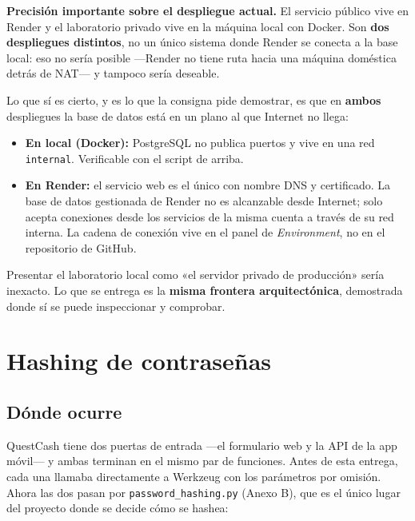 \documentclass[11pt,letterpaper]{article}
\begin{document}
\begin{alerta}
\textbf{Precisión importante sobre el despliegue actual.} El servicio público
vive en Render y el laboratorio privado vive en la máquina local con Docker.
Son \textbf{dos despliegues distintos}, no un único sistema donde Render se
conecta a la base local: eso no sería posible —Render no tiene ruta hacia una
máquina doméstica detrás de NAT— y tampoco sería deseable.

Lo que sí es cierto, y es lo que la consigna pide demostrar, es que en
\textbf{ambos} despliegues la base de datos está en un plano al que Internet no
llega:

\begin{itemize}[leftmargin=1.4em,itemsep=2pt]
  \item \textbf{En local (Docker):} PostgreSQL no publica puertos y vive en una
        red \texttt{internal}. Verificable con el script de arriba.
  \item \textbf{En Render:} el servicio web es el único con nombre DNS y
        certificado. La base de datos gestionada de Render no es alcanzable
        desde Internet; solo acepta conexiones desde los servicios de la misma
        cuenta a través de su red interna. La cadena de conexión vive en el
        panel de \emph{Environment}, no en el repositorio de GitHub.
\end{itemize}

Presentar el laboratorio local como «el servidor privado de producción» sería
inexacto. Lo que se entrega es la \textbf{misma frontera arquitectónica},
demostrada donde sí se puede inspeccionar y comprobar.
\end{alerta}

\section{Hashing de contraseñas}

\subsection{Dónde ocurre}

QuestCash tiene dos puertas de entrada —el formulario web y la API de la app
móvil— y ambas terminan en el mismo par de funciones. Antes de esta entrega,
cada una llamaba directamente a Werkzeug con los parámetros por omisión. Ahora
las dos pasan por \texttt{password\_hashing.py} (Anexo B), que es el único
lugar del proyecto donde se decide cómo se hashea:
\end{document}

